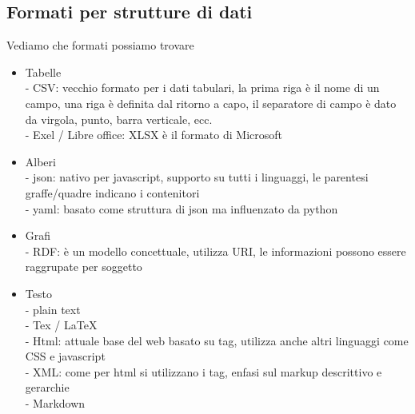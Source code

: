 \documentclass[a4paper,12pt]{article}
\begin{document}
\subsection{Formati per strutture di dati}
Vediamo che formati possiamo trovare
\begin{itemize}
  \item Tabelle \\
  - CSV: vecchio formato per i dati tabulari, la prima riga è il nome di un campo, una riga è definita dal ritorno a capo, il separatore di campo è dato da virgola, punto, barra verticale, ecc. \\
  - Exel / Libre office: XLSX è il formato di Microsoft  
  \item Alberi \\
  - json: nativo per javascript, supporto su tutti i linguaggi, le parentesi graffe/quadre indicano i contenitori \\
  - yaml: basato come struttura di json ma influenzato da python
  \item Grafi \\
  - RDF: è un modello concettuale, utilizza URI, le informazioni possono essere raggrupate per soggetto 
  \item Testo \\
  - plain text \\
  - Tex / LaTeX \\
  - Html: attuale base del web basato su tag, utilizza anche altri linguaggi come CSS e javascript \\
  - XML: come per html si utilizzano i tag, enfasi sul markup descrittivo e gerarchie\\
  - Markdown
\end{itemize}
\end{document}
